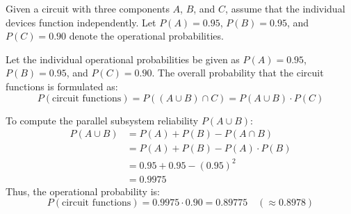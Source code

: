 \begin{example}
    Given a circuit with three components $A$, $B$, and $C$, assume that the individual devices function independently.
    Let $P(A) = 0.95$, $P(B) = 0.95$, and $P(C) = 0.90$ denote the operational probabilities.

    \begin{center}
        \label{fig:2.5}
    \end{center}\medskip

    Let the individual operational probabilities be given as $P(A) = 0.95$, $P(B) = 0.95$, and $P(C) = 0.90$.
    The overall probability that the circuit functions is formulated as:
    \[
    P(\text{circuit functions}) = P((A \cup B) \cap C) = P(A \cup B) \cdot P(C)
    \]

    To compute the parallel subsystem reliability $P(A \cup B)$:
    \begin{align*}
        P(A \cup B) &= P(A) + P(B) - P(A \cap B) \\
        &= P(A) + P(B) - P(A) \cdot P(B) \\
        &= 0.95 + 0.95 - (0.95)^2 \\
        &= 0.9975
    \end{align*}
    Thus, the operational probability is:
    \[
        P(\text{circuit functions}) = 0.9975 \cdot 0.90 = \mathbf{0.89775} \quad (\approx 0.8978)
    \]
\end{example}   

